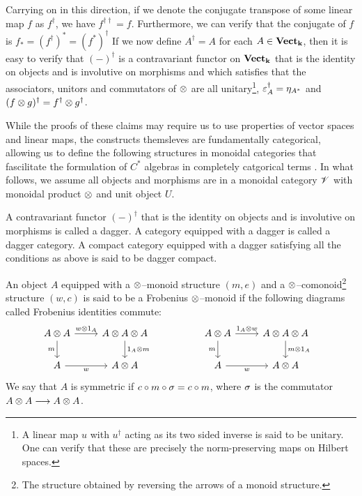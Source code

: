 Carrying on in this direction, if we denote the conjugate transpose of some
linear map $f$ as $f^{\dagger}$, we have $f^{\dagger \dagger} = f$. Furthermore,
we can verify that the conjugate of $f$ is $f_* = (f^{\dagger})^* =
(f^*)^{\dagger}$ If we now define $A^{\dagger} = A$ for each $A \in
\textbf{Vect}_{\mathbf{k}}$, then it is easy to verify that $(-)^{\dagger}$ is a
contravariant functor on $\textbf{Vect}_{\mathbf{k}}$ that is the identity on objects
and is involutive on morphisms and which satisfies that the associators, unitors
and commutators of $\otimes$ are all unitary\footnote{A linear map $u$ with
$u^{\dagger}$ acting as its two sided inverse is said to be unitary. One can
verify that these are precisely the norm-preserving maps on Hilbert spaces.},
$\varepsilon_{A}^{\dagger} = \eta_{A^*}$ and
$(f \otimes g)^{\dagger} = f^{\dagger} \otimes g^{\dagger}$.

While the proofs of these claims may require us to use properties of vector
spaces and linear maps, the constructs themsleves are fundamentally categorical,
allowing us to define the following structures in monoidal categories that
fascilitate the formulation of $C^*$ algebras in completely catgorical terms
\cite{channels}. In what follows, we assume all objects and morphisms are in a
monoidal category $\mathscr{V}$ with monoidal product $\otimes$ and unit object $U$.

\begin{defn}
A contravariant functor $(-)^{\dagger}$ that is the identity on objects and is
involutive on morphisms is called a dagger. A category equipped with a dagger is
called a dagger category. A compact category equipped with a dagger satisfying
all the conditions as above is said to be dagger compact.
\end{defn}

\begin{defn}
An object $A$ equipped with a $\otimes$--monoid structure $(m, e)$ and a
$\otimes$--comonoid\footnote{The structure obtained by reversing the arrows of a
monoid structure.} structure $(w, c)$ is said to be a Frobenius $\otimes$--monoid if
the following diagrams called Frobenius identities commute:
\begin{eqnarray*}
\begin{tikzcd}
A \m A \arrow[r, "w \m 1_A"] \arrow[d, "m" left] &
A \m A \m A \arrow[d, "1_A \m m" right] \\
A \arrow[r, "w" below] &
A \m A
\end{tikzcd} \hspace{5em} &
\begin{tikzcd}
A \m A \arrow[r, "1_A \m w"] \arrow[d, "m" left] &
A \m A \m A \arrow[d, "m \m 1_A" right] \\
A \arrow[r, "w" below] &
A \m A
\end{tikzcd}
\end{eqnarray*}
We say that $A$ is symmetric if $c \circ m \circ \sigma = c \circ m$, where $\sigma$
is the commutator $A \otimes A \stackrel{}{\longrightarrow} A \otimes A$.
\end{defn}

